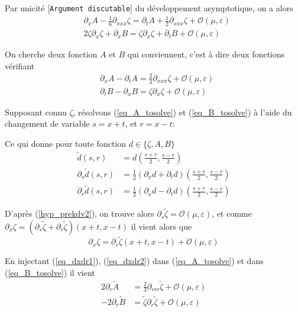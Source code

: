 \documentclass[12pt,a4paper]{article}
\numberwithin{equation}{section}
\begin{document}
Par unicité [\texttt{Argument discutable}] du développement asymptotique, on a alors
\begin{align*}
    & \partial_x A - \frac{1}{6}\partial_{xxx}\zeta = \partial_t A + \frac{1}{2}\partial_{xxx}\zeta + \mathcal{O}(\mu, \varepsilon)\\
    &2\zeta\partial_x\zeta + \partial_x B =\zeta\partial_x\zeta + \partial_t B + \mathcal{O}(\mu, \varepsilon)
\end{align*}

On cherche deux fonction $A$ et $B$ qui conviennent, c'est à dire deux fonctions vérifiant 
\begin{align}
    & \partial_x A -\partial_t A =  \frac{2}{3}\partial_{xxx}\zeta  + \mathcal{O}(\mu, \varepsilon)\label{eq_A_tosolve}\\
    &\partial_t B - \partial_x B =\zeta\partial_x\zeta  + \mathcal{O}(\mu, \varepsilon)\label{eq_B_tosolve}
\end{align}

Supposant connu $\zeta$, résolvons (\ref{eq_A_tosolve}) et (\ref{eq_B_tosolve}) à l'aide du changement de variable $s = x+t$, et $r = x-t$:

Ce qui donne pour toute fonction $d\in \{\zeta,A,B\}$
\begin{align}
    \tilde{d}(s,r) &= d\left(\frac{s+r}{2}, \frac{s-r}{2}\right)\\
    \partial_s\tilde{d}(s,r) &= \frac{1}{2}\left(\partial_xd + \partial_td\right)\left(\frac{s+r}{2}, \frac{s-r}{2}\right)\\
    \partial_r\tilde{d}(s,r) &= \frac{1}{2} \left(\partial_xd - \partial_td\right)\left(\frac{s+r}{2}, \frac{s-r}{2}\right)\label{eq_dxdr1}
\end{align}

D'après (\ref{hyp_prekdv2}), on trouve alors $\partial_s\tilde{\zeta} = \mathcal{O}(\mu, \varepsilon)$, et comme $\partial_x\zeta = (\partial_s\tilde{\zeta} + \partial_r\tilde{\zeta})(x+t, x-t)$ il vient alors que
\begin{equation}
    \partial_x\zeta = \partial_r\tilde{\zeta}(x+t,x-t) + \mathcal{O}(\mu,\varepsilon) \label{eq_dxdr2}
\end{equation}

En injectant (\ref{eq_dxdr1}), (\ref{eq_dxdr2}) dans (\ref{eq_A_tosolve}) et dans (\ref{eq_B_tosolve}) il vient
\begin{align*}
    2\partial_r\tilde{A} &= \frac{2}{3}\partial_{rrr}\tilde\zeta  +\mathcal{O}(\mu,\varepsilon)\\
    -2\partial_r\tilde{B} &= \tilde\zeta\partial_r\tilde\zeta +\mathcal{O}(\mu,\varepsilon)
\end{align*}
\end{document}
